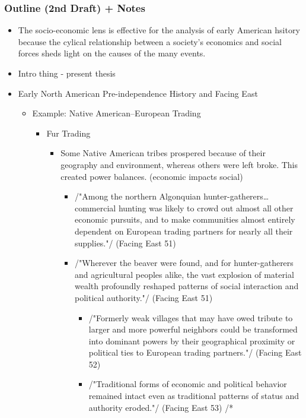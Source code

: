 \documentclass[letterpaper]{article}
\begin{document}
\subsubsection{Outline (2nd Draft) + Notes}
\label{sec:orgee59705}
\begin{itemize}
\item The socio-economic lens is effective for the analysis of early
American hsitory because the cylical relationship between a society's
economics and social forces sheds light on the causes of the many
events.

\item Intro thing - present thesis
\item Early North American Pre-independence History and Facing East

\begin{itemize}
\item Example: Native American--European Trading

\begin{itemize}
\item Fur Trading

\begin{itemize}
\item Some Native American tribes prospered because of their
geography and environment, whereas others were left broke. This
created power balances. (economic impacts social)

\begin{itemize}
\item /"Among the northern Algonquian hunter-gatherers\ldots{}commercial
hunting was likely to crowd out almost all other economic
pursuits, and to make communities almost entirely dependent
on European trading partners for nearly all their supplies."/
(Facing East 51)
\item /"Wherever the beaver were found, and for hunter-gatherers
and agricultural peoples alike, the vast explosion of
material wealth profoundly reshaped patterns of social
interaction and political authority."/ (Facing East 51)

\begin{itemize}
\item /"Formerly weak villages that may have owed tribute to
larger and more powerful neighbors could be transformed
into dominant powers by their geographical proximity or
political ties to European trading partners."/ (Facing
East 52)
\item /"Traditional forms of economic and political behavior
remained intact even as traditional patterns of status and
authority eroded."/ (Facing East 53) /*
\end{itemize}
\end{itemize}
\end{itemize}


\end{itemize}
\end{itemize}
\end{itemize}
\end{document}
